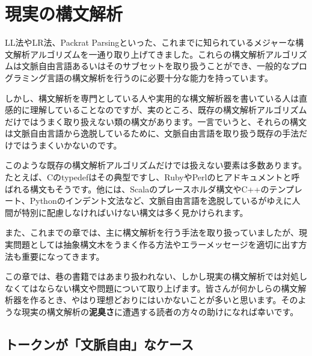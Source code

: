 \hypertarget{chapter7-ux73feux5b9fux306eux69cbux6587ux89e3ux6790}{%
\chapter{現実の構文解析}\label{chapter7-ux73feux5b9fux306eux69cbux6587ux89e3ux6790}}

LL法やLR法、Packrat Parsingといった、これまでに知られているメジャーな構文解析アルゴリズムを一通り取り上げてきました。これらの構文解析アルゴリズムは文脈自由言語あるいはそのサブセットを取り扱うことができ、一般的なプログラミング言語の構文解析を行うのに必要十分な能力を持っています。

しかし、構文解析を専門としている人や実用的な構文解析器を書いている人は直感的に理解していることなのですが、実のところ、既存の構文解析アルゴリズムだけではうまく取り扱えない類の構文があります。一言でいうと、それらの構文は文脈自由言語から逸脱しているために、文脈自由言語を取り扱う既存の手法だけではうまくいかないのです。

このような既存の構文解析アルゴリズムだけでは扱えない要素は多数あります。たとえば、Cのtypedefはその典型ですし、RubyやPerlのヒアドキュメントと呼ばれる構文もそうです。他には、Scalaのプレースホルダ構文やC++のテンプレート、Pythonのインデント文法など、文脈自由言語を逸脱しているがゆえに人間が特別に配慮しなければいけない構文は多く見かけられます。

また、これまでの章では、主に構文解析を行う手法を取り扱っていましたが、現実問題としては抽象構文木をうまく作る方法やエラーメッセージを適切に出す方法も重要になってきます。

この章では、巷の書籍ではあまり扱われない、しかし現実の構文解析では対処しなくてはならない構文や問題について取り上げます。皆さんが何かしらの構文解析器を作るとき、やはり理想どおりにはいかないことが多いと思います。そのような現実の構文解析の\textbf{泥臭さ}に遭遇する読者の方々の助けになれば幸いです。

\hypertarget{chapter7-ux30c8ux30fcux30afux30f3ux304cux6587ux8108ux81eaux7531ux306aux30b1ux30fcux30b9}{%
\section{トークンが「文脈自由」なケース}\label{chapter7-ux30c8ux30fcux30afux30f3ux304cux6587ux8108ux81eaux7531ux306aux30b1ux30fcux30b9}}

